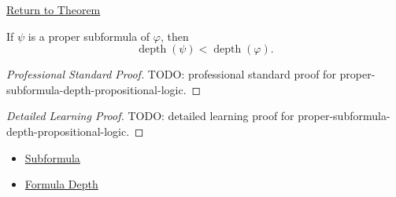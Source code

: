 \newpage
{}
\label{prf:proper-subformula-depth-propositional-logic}

\begin{remark*}[Return]
\hyperref[lem:proper-subformula-depth-propositional-logic]{Return to Theorem}
\end{remark*}

\begin{lemma*}
If \(\psi\) is a proper subformula of \(\varphi\), then
\[
\operatorname{depth}(\psi)<\operatorname{depth}(\varphi).
\]
\end{lemma*}

\begin{proof}[Professional Standard Proof]
\LRAProofBodyStart
TODO: professional standard proof for proper-subformula-depth-propositional-logic.
\end{proof}

\begin{proof}[Detailed Learning Proof]
\LRAProofBodyStart
TODO: detailed learning proof for proper-subformula-depth-propositional-logic.
\end{proof}

\begin{remark*}
\end{remark*}

\begin{dependencies}
\begin{itemize}
  \item \hyperref[def:subformula-propositional-logic]{Subformula}
  \item \hyperref[def:formula-depth-propositional-logic]{Formula Depth}
\end{itemize}
\end{dependencies}

\clearpage
